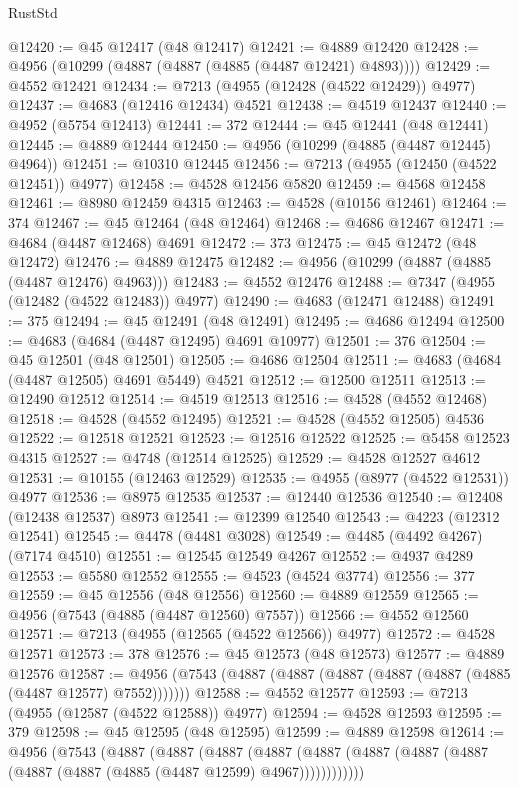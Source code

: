 \begin{lexlean}{RustStd}
\begin{coremodule}
@12420 := @45 @12417 (@48 @12417)
@12421 := @4889 @12420
@12428 := @4956 (@10299 (@4887 (@4887 (@4885 (@4487 @12421) @4893))))
@12429 := @4552 @12421
@12434 := @7213 (@4955 (@12428 (@4522 @12429)) @4977)
@12437 := @4683 (@12416 @12434) @4521
@12438 := @4519 @12437
@12440 := @4952 (@5754 @12413)
@12441 := 372
@12444 := @45 @12441 (@48 @12441)
@12445 := @4889 @12444
@12450 := @4956 (@10299 (@4885 (@4487 @12445) @4964))
@12451 := @10310 @12445
@12456 := @7213 (@4955 (@12450 (@4522 @12451)) @4977)
@12458 := @4528 @12456 @5820
@12459 := @4568 @12458
@12461 := @8980 @12459 @4315
@12463 := @4528 (@10156 @12461)
@12464 := 374
@12467 := @45 @12464 (@48 @12464)
@12468 := @4686 @12467
@12471 := @4684 (@4487 @12468) @4691
@12472 := 373
@12475 := @45 @12472 (@48 @12472)
@12476 := @4889 @12475
@12482 := @4956 (@10299 (@4887 (@4885 (@4487 @12476) @4963)))
@12483 := @4552 @12476
@12488 := @7347 (@4955 (@12482 (@4522 @12483)) @4977)
@12490 := @4683 (@12471 @12488)
@12491 := 375
@12494 := @45 @12491 (@48 @12491)
@12495 := @4686 @12494
@12500 := @4683 (@4684 (@4487 @12495) @4691 @10977)
@12501 := 376
@12504 := @45 @12501 (@48 @12501)
@12505 := @4686 @12504
@12511 := @4683 (@4684 (@4487 @12505) @4691 @5449) @4521
@12512 := @12500 @12511
@12513 := @12490 @12512
@12514 := @4519 @12513
@12516 := @4528 (@4552 @12468)
@12518 := @4528 (@4552 @12495)
@12521 := @4528 (@4552 @12505) @4536
@12522 := @12518 @12521
@12523 := @12516 @12522
@12525 := @5458 @12523 @4315
@12527 := @4748 (@12514 @12525)
@12529 := @4528 @12527 @4612
@12531 := @10155 (@12463 @12529)
@12535 := @4955 (@8977 (@4522 @12531)) @4977
@12536 := @8975 @12535
@12537 := @12440 @12536
@12540 := @12408 (@12438 @12537) @8973
@12541 := @12399 @12540
@12543 := @4223 (@12312 @12541)
@12545 := @4478 (@4481 @3028)
@12549 := @4485 (@4492 @4267) (@7174 @4510)
@12551 := @12545 @12549 @4267
@12552 := @4937 @4289
@12553 := @5580 @12552
@12555 := @4523 (@4524 @3774)
@12556 := 377
@12559 := @45 @12556 (@48 @12556)
@12560 := @4889 @12559
@12565 := @4956 (@7543 (@4885 (@4487 @12560) @7557))
@12566 := @4552 @12560
@12571 := @7213 (@4955 (@12565 (@4522 @12566)) @4977)
@12572 := @4528 @12571
@12573 := 378
@12576 := @45 @12573 (@48 @12573)
@12577 := @4889 @12576
@12587 := @4956 (@7543 (@4887 (@4887 (@4887 (@4887 (@4887 (@4885 (@4487 @12577) @7552)))))))
@12588 := @4552 @12577
@12593 := @7213 (@4955 (@12587 (@4522 @12588)) @4977)
@12594 := @4528 @12593
@12595 := 379
@12598 := @45 @12595 (@48 @12595)
@12599 := @4889 @12598
@12614 := @4956
    (@7543
      (@4887
        (@4887
          (@4887
            (@4887 (@4887 (@4887 (@4887 (@4887 (@4887 (@4887 (@4885 (@4487 @12599) @4967))))))))))))

\end{coremodule}
\end{lexlean}
